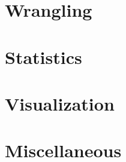 \begin{appendices}
\section{Wrangling}


\section{Statistics}


\section{Visualization}


% 

% 

\section{Miscellaneous}


\end{appendices}
